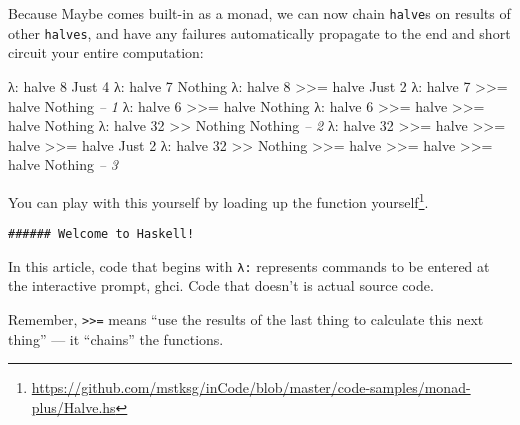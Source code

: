 \documentclass[]{article}
\newenvironment{Shaded}{}{}
\newcommand{\DataTypeTok}[1]{\textcolor[rgb]{0.56,0.13,0.00}{{#1}}}
\newcommand{\DecValTok}[1]{\textcolor[rgb]{0.25,0.63,0.44}{{#1}}}
\newcommand{\CommentTok}[1]{\textcolor[rgb]{0.38,0.63,0.69}{\textit{{#1}}}}
\newcommand{\FunctionTok}[1]{\textcolor[rgb]{0.02,0.16,0.49}{{#1}}}
\newcommand{\NormalTok}[1]{{#1}}
\renewcommand{\href}[2]{#2\footnote{\url{#1}}}
\begin{document}
Because Maybe comes built-in as a monad, we can now chain
\texttt{halve}s on results of other \texttt{halves}, and have any
failures automatically propagate to the end and short circuit your
entire computation:

\begin{Shaded}
\begin{Highlighting}[]
\NormalTok{λ}\FunctionTok{:} \NormalTok{halve }\DecValTok{8}
\DataTypeTok{Just} \DecValTok{4}
\NormalTok{λ}\FunctionTok{:} \NormalTok{halve }\DecValTok{7}
\DataTypeTok{Nothing}
\NormalTok{λ}\FunctionTok{:} \NormalTok{halve }\DecValTok{8} \FunctionTok{>>=} \NormalTok{halve}
\DataTypeTok{Just} \DecValTok{2}
\NormalTok{λ}\FunctionTok{:} \NormalTok{halve }\DecValTok{7} \FunctionTok{>>=} \NormalTok{halve}
\DataTypeTok{Nothing}                         \CommentTok{-- 1}
\NormalTok{λ}\FunctionTok{:} \NormalTok{halve }\DecValTok{6} \FunctionTok{>>=} \NormalTok{halve}
\DataTypeTok{Nothing}
\NormalTok{λ}\FunctionTok{:} \NormalTok{halve }\DecValTok{6} \FunctionTok{>>=} \NormalTok{halve }\FunctionTok{>>=} \NormalTok{halve}
\DataTypeTok{Nothing}
\NormalTok{λ}\FunctionTok{:} \NormalTok{halve }\DecValTok{32} \FunctionTok{>>} \DataTypeTok{Nothing}
\DataTypeTok{Nothing}                         \CommentTok{-- 2}
\NormalTok{λ}\FunctionTok{:} \NormalTok{halve }\DecValTok{32} \FunctionTok{>>=} \NormalTok{halve }\FunctionTok{>>=} \NormalTok{halve }\FunctionTok{>>=} \NormalTok{halve}
\DataTypeTok{Just} \DecValTok{2}
\NormalTok{λ}\FunctionTok{:} \NormalTok{halve }\DecValTok{32} \FunctionTok{>>} \DataTypeTok{Nothing} \FunctionTok{>>=} \NormalTok{halve }\FunctionTok{>>=} \NormalTok{halve }\FunctionTok{>>=} \NormalTok{halve}
\DataTypeTok{Nothing}                         \CommentTok{-- 3}
\end{Highlighting}
\end{Shaded}

You can play with this yourself by
\href{https://github.com/mstksg/inCode/blob/master/code-samples/monad-plus/Halve.hs}{loading
up the function yourself}.

\begin{verbatim}
###### Welcome to Haskell!
\end{verbatim}

In this article, code that begins with \texttt{λ:} represents commands
to be entered at the interactive prompt, ghci. Code that doesn't is
actual source code.

Remember, \texttt{\textgreater{}\textgreater{}=} means ``use the results
of the last thing to calculate this next thing'' --- it ``chains'' the
functions.
\end{document}
